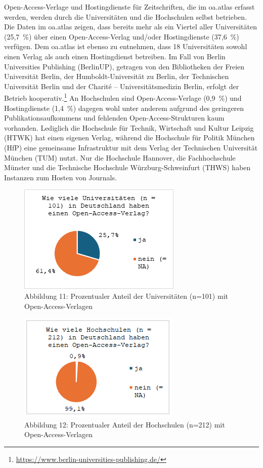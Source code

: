 \documentclass[a4paper,
fontsize=11pt,
oneside,
numbers=noperiodatend,
parskip=half-,
bibliography=totoc,
final
]{scrartcl}
\begin{document}
Open-Access-Verlage und Hostingdienste für Zeitschriften, die im
oa.atlas erfasst werden, werden durch die Universitäten und die
Hochschulen selbst betrieben. Die Daten im oa.atlas zeigen, dass bereits
mehr als ein Viertel aller Universitäten (25,7~\%) über einen
Open-Access-Verlag und/oder Hostingdienste (37,6~\%) verfügen. Dem
oa.atlas ist ebenso zu entnehmen, dass 18 Universitäten sowohl einen
Verlag als auch einen Hostingdienst betreiben. Im Fall von Berlin
Universities Publishing (BerlinUP), getragen von den Bibliotheken der
Freien Universität Berlin, der Humboldt-Universität zu Berlin, der
Technischen Universität Berlin und der Charité -- Universitätsmedizin
Berlin, erfolgt der Betrieb kooperativ.\footnote{\url{https://www.berlin-universities-publishing.de/}}
An Hochschulen sind Open-Access-Verlage (0,9~\%) und Hostingdienste
(1,4~\%) dagegen wohl unter anderem aufgrund des geringeren
Publikationsaufkommens und fehlenden Open-Access-Strukturen kaum
vorhanden. Lediglich die Hochschule für Technik, Wirtschaft und Kultur
Leipzig (HTWK) hat einen eigenen Verlag, während die Hochschule für
Politik München (HfP) eine gemeinsame Infrastruktur mit dem Verlag der
Technischen Universität München (TUM) nutzt. Nur die Hochschule
Hannover, die Fachhochschule Münster und die Technische Hochschule
Würzburg-Schweinfurt (THWS) haben Instanzen zum Hosten von Journals.


\begin{figure}[H]
\centering
\includegraphics[]{img/image012.png}
\caption{Abbildung 11: Prozentualer Anteil der Universitäten (n=101) mit Open-Access-Verlagen}
\end{figure}

\begin{figure}[H]
\centering
\includegraphics[]{img/image011.png}
\caption{Abbildung 12: Prozentualer Anteil der Hochschulen (n=212) mit Open-Access-Verlagen}
\end{figure}
\end{document}
